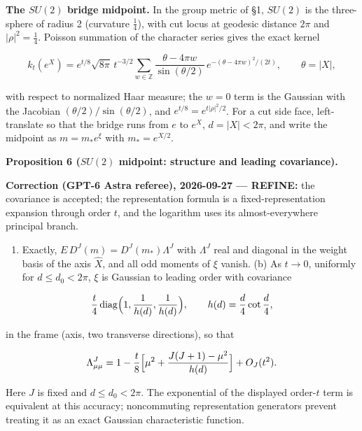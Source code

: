 \documentclass[11pt,a4paper]{article}
\newcommand{\tightlist}{\setlength{\itemsep}{0pt}\setlength{\parskip}{0pt}}
\begin{document}
\textbf{The \(SU(2)\) bridge midpoint.} In the group metric of §1,
\(SU(2)\) is the three-sphere of radius 2 (curvature \(\frac14\)), with
cut locus at geodesic distance \(2\pi\) and \(|\rho|^2=\frac14\).
Poisson summation of the character series gives the exact kernel

\[k_t(e^X)=e^{t/8}\sqrt{8\pi}\,t^{-3/2}\sum_{w\in\mathbb Z}
\frac{\theta-4\pi w}{\sin(\theta/2)}\,e^{-(\theta-4\pi w)^2/(2t)},
\qquad\theta=|X|, \tag{11}\]

with respect to normalized Haar measure; the \(w=0\) term is the
Gaussian with the Jacobian \((\theta/2)/\sin(\theta/2)\), and
\(e^{t/8}=e^{t|\rho|^2/2}\). For a cut side face, left-translate so that
the bridge runs from \(e\) to \(e^X\), \(d=|X|<2\pi\), and write the
midpoint as \(m=m_*e^{\xi}\) with \(m_*=e^{X/2}\).

\textbf{Proposition 6 (\(SU(2)\) midpoint: structure and leading
covariance).}

\textbf{Correction (GPT-6 Astra referee), 2026-09-27 --- REFINE:} the
covariance is accepted; the representation formula is a
fixed-representation expansion through order \(t\), and the logarithm
uses its almost-everywhere principal branch.

\begin{enumerate}
\def\labelenumi{(\alph{enumi})}
\tightlist
\item
  Exactly, \(E\,D^J(m)=D^J(m_*)\Lambda^J\) with \(\Lambda^J\) real and
  diagonal in the weight basis of the axis \(\hat X\), and all odd
  moments of \(\xi\) vanish. (b) As \(t\to0\), uniformly for
  \(d\le d_0<2\pi\), \(\xi\) is Gaussian to leading order with
  covariance
\end{enumerate}

\[\frac t4\,{\rm diag}\Bigl(1,\frac1{h(d)},\frac1{h(d)}\Bigr),\qquad
h(d)=\frac d4\cot\frac d4,\]

in the frame (axis, two transverse directions), so that

\[\Lambda^J_{\mu\mu}=1-\frac t8\Bigl[\mu^2
+\frac{J(J+1)-\mu^2}{h(d)}\Bigr]+O_J(t^2).\]

Here \(J\) is fixed and \(d\le d_0<2\pi\). The exponential of the
displayed order-\(t\) term is equivalent at this accuracy; noncommuting
representation generators prevent treating it as an exact Gaussian
characteristic function.
\end{document}

